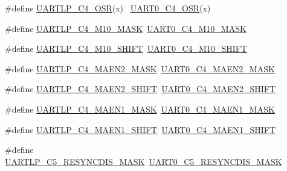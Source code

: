 \begin{DoxyCompactItemize}
\item 
\#define \hyperlink{group___backward___compatibility___symbols_ga47b840bc000a94a56830c61a84b611f5}{U\+A\+R\+T\+L\+P\+\_\+\+C4\+\_\+\+O\+SR}(x)                                              ~\hyperlink{group___u_a_r_t0___register___masks_ga762dbebb5b684005e64f4b16a30d2a86}{U\+A\+R\+T0\+\_\+\+C4\+\_\+\+O\+SR}(x)
\item 
\#define \hyperlink{group___backward___compatibility___symbols_gae6f095de7ec64e7c5f070cace84825f2}{U\+A\+R\+T\+L\+P\+\_\+\+C4\+\_\+\+M10\+\_\+\+M\+A\+SK}~\hyperlink{group___u_a_r_t0___register___masks_ga778c67fb72d292b38f63c9381650b13f}{U\+A\+R\+T0\+\_\+\+C4\+\_\+\+M10\+\_\+\+M\+A\+SK}
\item 
\#define \hyperlink{group___backward___compatibility___symbols_ga5bf55e06cfac817fc0cc879b5bd8df17}{U\+A\+R\+T\+L\+P\+\_\+\+C4\+\_\+\+M10\+\_\+\+S\+H\+I\+FT}~\hyperlink{group___u_a_r_t0___register___masks_gab29f680fddde40016111f2aef73cc7b2}{U\+A\+R\+T0\+\_\+\+C4\+\_\+\+M10\+\_\+\+S\+H\+I\+FT}
\item 
\#define \hyperlink{group___backward___compatibility___symbols_ga90e33c5bb1be6d39e1d0f937253daf0b}{U\+A\+R\+T\+L\+P\+\_\+\+C4\+\_\+\+M\+A\+E\+N2\+\_\+\+M\+A\+SK}~\hyperlink{group___u_a_r_t0___register___masks_ga969c6c22e07f6502ff99cbf303b87d23}{U\+A\+R\+T0\+\_\+\+C4\+\_\+\+M\+A\+E\+N2\+\_\+\+M\+A\+SK}
\item 
\#define \hyperlink{group___backward___compatibility___symbols_ga9b129e14e5aac5ef9707937d91fd0046}{U\+A\+R\+T\+L\+P\+\_\+\+C4\+\_\+\+M\+A\+E\+N2\+\_\+\+S\+H\+I\+FT}~\hyperlink{group___u_a_r_t0___register___masks_gaeebc760f3af31b66126f430423fc0131}{U\+A\+R\+T0\+\_\+\+C4\+\_\+\+M\+A\+E\+N2\+\_\+\+S\+H\+I\+FT}
\item 
\#define \hyperlink{group___backward___compatibility___symbols_gaf8e8a31f6af1dbfe4e930d0c7bffe375}{U\+A\+R\+T\+L\+P\+\_\+\+C4\+\_\+\+M\+A\+E\+N1\+\_\+\+M\+A\+SK}~\hyperlink{group___u_a_r_t0___register___masks_ga68a92c3e845ce6ef575114d47d5d447c}{U\+A\+R\+T0\+\_\+\+C4\+\_\+\+M\+A\+E\+N1\+\_\+\+M\+A\+SK}
\item 
\#define \hyperlink{group___backward___compatibility___symbols_ga0c83ed1dac8e50a43d52747f42b80a3d}{U\+A\+R\+T\+L\+P\+\_\+\+C4\+\_\+\+M\+A\+E\+N1\+\_\+\+S\+H\+I\+FT}~\hyperlink{group___u_a_r_t0___register___masks_ga799c5f7dd350d4bd89d04167fa771396}{U\+A\+R\+T0\+\_\+\+C4\+\_\+\+M\+A\+E\+N1\+\_\+\+S\+H\+I\+FT}
\item 
\#define \hyperlink{group___backward___compatibility___symbols_ga6c8f73a689a6c4d5d7425325b8c3bde2}{U\+A\+R\+T\+L\+P\+\_\+\+C5\+\_\+\+R\+E\+S\+Y\+N\+C\+D\+I\+S\+\_\+\+M\+A\+SK}~\hyperlink{group___u_a_r_t0___register___masks_ga6cbc7334e715b4d22547ae185dc63dda}{U\+A\+R\+T0\+\_\+\+C5\+\_\+\+R\+E\+S\+Y\+N\+C\+D\+I\+S\+\_\+\+M\+A\+SK}

\end{DoxyCompactItemize}
